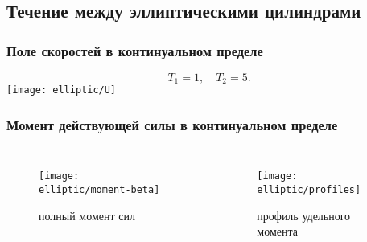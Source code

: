 \documentclass[mathserif]{beamer} %
\begin{document}
\begin{comment}
    Формулы для ёмкости [Smythe1968]:
    \begin{gather}
        C_\mathrm{cyl} \propto \frac1{\theta}, \\
        C_\mathrm{sph} \propto  \sum_{n=1}^\infty \frac{R_1 R_2 \sinh\theta} {R_2\sinh n\theta - R_1\sinh (n-1)\theta}, \\
        \cosh\theta = \frac{R_1^2 + R_2^2 - d^2}{2 R_1 R_2}.
    \end{gather}
\end{frame}


\begin{frame}
    \frametitle{Профили составляющих силу компонент}
    \begin{columns}
        \column{.6\textwidth}
        \begin{figure}
            \texttt{[image: noncoaxial/terms-cylinder-inner]}
            \vspace{-.5cm}\caption{внутренний цилиндр}
        \end{figure}
        \column{.6\textwidth}
        \begin{figure}
            \texttt{[image: noncoaxial/terms-cylinder-outer]}
            \vspace{-.5cm}\caption{внешний цилиндр}
        \end{figure}
    \end{columns}
\end{frame}

\end{comment}

\subsection{Течение между эллиптическими цилиндрами}

\begin{frame}
    \frametitle{Поле скоростей в континуальном пределе}
    \[ T_1 = 1, \quad T_2 = 5.\]
    \centering
    \hspace{-1cm}
    \texttt{[image: elliptic/U]}
    \hspace{-1cm}
\end{frame}

\begin{frame}
    \frametitle{Момент действующей силы в континуальном пределе}
    \begin{columns}
        \begin{figure}
            \texttt{[image: elliptic/moment-beta]}
            \caption{полный момент сил}
        \end{figure}
        \begin{figure}
            \texttt{[image: elliptic/profiles]}
            \caption{профиль удельного момента}
        \end{figure}
    \end{columns}
\end{frame}
\end{document}
